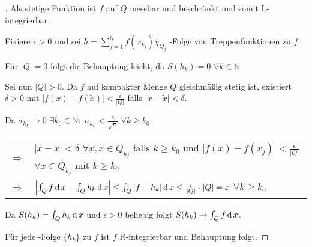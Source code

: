 \begin{proof}[]
	Als stetige Funktion ist $f$ auf $Q$ messbar und beschränkt und somit L-integrierbar.
	
	Fixiere $\epsilon > 0$ und sei $h=\sum_{j=1}^{l_k} f(x_{k_j}) \chi_{Q_j}$ -Folge von Treppenfunktionen zu $f$.
	
	Für $\vert Q \vert = 0$ folgt die Behauptung leicht, da $S(h_k) = 0$ $\forall k\in\mathbb{N}$
	
	Sei nun $\vert Q \vert > 0$. Da $f$ auf kompakter Menge $Q$ gleichmäßig stetig ist, existiert $\delta > 0$ mit $\vert f(x) - f(\tilde{x})\vert < \frac{\epsilon}{\vert Q \vert}$ falls $\vert x - \tilde{x}\vert < \delta$.
	
	Da $\sigma_{h_k}\to 0$ $\exists k_0\in\mathbb{N}:$ $\sigma_{h_k} < \frac{\delta}{\sqrt{n}}$ $\forall k\ge k_0$ \\
	\begin{tabularx}{\linewidth}{r@{\ \ }X}
	$\Rightarrow$ & $\vert x - \tilde{x}\vert < \delta$ $\forall x,\tilde{x}\in Q_{k_j}$ falls $k\ge k_0$ und $\vert f(x) - f(x_{j})\vert < \frac{\epsilon}{\vert Q \vert}$ $\forall x\in Q_{k_j}$ mit $k\ge k_0$\\
	$\Rightarrow$ & $\left\vert \int_Q f\operatorname{d} x - \int_Q h_k \operatorname{d} x \right\vert \le \int_Q \vert f - h_k\vert \operatorname{d} x \le \frac{\varepsilon}{\vert Q \vert}\cdot \vert Q \vert = \varepsilon$ $\forall k\ge k_0$
	\end{tabularx}
	
	Da $S(h_k) = \int_Q h_k \operatorname{d} x$ und $\epsilon > 0$ beliebig folgt $S(h_k)\to \int_Q f\operatorname{d} x$.
	
	Für jede -Folge $\{h_k\}$ zu $f$ ist $f$ R-integrierbar und Behauptung folgt.
\end{proof}